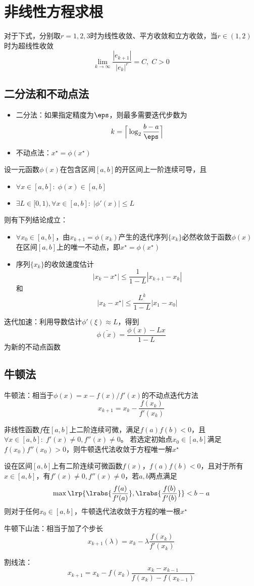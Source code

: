 
\section{非线性方程求根}
对于下式，分别取$r=1,2,3$时为线性收敛、平方收敛和立方收敛，当$r\in(1,2)$时为超线性收敛
\[\lim_{k\to\infty}\frac{|e_{k+1}|}{|e_k|^r}=C,\;C>0\]

\subsection{二分法和不动点法}
\begin{itemize}
\item 二分法：如果指定精度为$\eps$，则最多需要迭代步数为
\[k=\Big\lceil\log_2\frac{b-a}{\eps}\Big\rceil\]
\item 不动点法：$x^\star=\phi(x^\star)$
\end{itemize}
\begin{theorem}
    设一元函数$\phi(x)$在包含区间$[a,b]$的开区间上一阶连续可导，且
    \begin{itemize}
        \item $\forall x\in[a,b]:\;\phi(x)\in[a,b]$
        \item $\exists L\in[0,1),\forall x\in[a,b]:\;|\phi'(x)|\leq L$
    \end{itemize}
    则有下列结论成立：
    \begin{itemize}
        \item $\forall x_0\in[a,b]$，由$x_{k+1}=\phi(x_k)$产生的迭代序列$\{x_k\}$必然收敛于函数$\phi(x)$在区间$[a,b]$上的唯一不动点，即$x^\star=\phi(x^\star)$
        \item 序列$\{x_k\}$的收敛速度估计
        \[|x_k-x^\star|\leq\frac{1}{1-L}|x_{k+1}-x_k|\]
        和
        \[|x_k-x^\star|\leq\frac{L^k}{1-L}|x_1-x_0|\]
    \end{itemize}
\end{theorem}

迭代加速：利用导数估计$\phi'(\xi)\approx L$，得到
\[\bar{\phi(x)}=\frac{\phi(x)-Lx}{1-L}\]
为新的不动点函数

\subsection{牛顿法}
牛顿法：相当于$\phi(x)=x-f(x)/f'(x)$的不动点迭代方法
\[x_{k+1}=x_{k}-\frac{f(x_k)}{f'(x_k)}\]
\begin{theorem}[牛顿法全局收敛性]
非线性函数$f$在$[a,b]$上二阶连续可微，满足$f(a)f(b)<0$，且$\forall x\in[a,b]:\;f'(x)\ne 0,f''(x)\ne 0$。
若选定初始点$x_0\in[a,b]$满足$f(x_0)f''(x_0)>0$，则牛顿迭代法收敛于方程唯一解$x^\star$
\end{theorem}
\begin{theorem}
设在区间$[a,b]$上有二阶连续可微函数$f(x)$，$f(a)f(b)<0$，且对于所有$x\in[a,b]$，有$f'(x)\ne 0,f''(x)\ne 0$，若$a,b$两点满足
\[\max\lrp{\lrabs{\frac{f(a)}{f'(a)}},\lrabs{\frac{f(b)}{f'(b)}}}<b-a\]
则对于任何$x_0\in[a,b]$，牛顿迭代法收敛于方程的唯一根$x^\star$
\end{theorem}

牛顿下山法：相当于加了个步长
\[x_{k+1}(\lambda)=x_k-\lambda\frac{f(x_k)}{f'(x_k)}\]

割线法：
\[x_{k+1}=x_k-f(x_k)\frac{x_k-x_{k-1}}{f(x_k)-f(x_{k-1})}\]